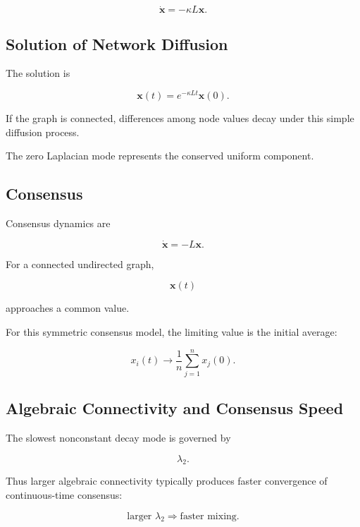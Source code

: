 \[
\boxed{
\dot{\mathbf{x}}
=
-\kappa L\mathbf{x}.
}
\]

\subsection{Solution of Network Diffusion}
\label{subsec:network-diffusion-solution}

The solution is

\[
\boxed{
\mathbf{x}(t)
=
e^{-\kappa Lt}
\mathbf{x}(0).
}
\]

If the graph is connected, differences among node values decay under this
simple diffusion process.

The zero Laplacian mode represents the conserved uniform component.

\subsection{Consensus}
\label{subsec:network-consensus}

Consensus dynamics are

\[
\boxed{
\dot{\mathbf{x}}
=
-L\mathbf{x}.
}
\]

For a connected undirected graph,

\[
\mathbf{x}(t)
\]

approaches a common value.

For this symmetric consensus model, the limiting value is the initial
average:

\[
\boxed{
x_i(t)
\to
\frac1n
\sum_{j=1}^{n}x_j(0).
}
\]

\subsection{Algebraic Connectivity and Consensus Speed}
\label{subsec:algebraic-connectivity-consensus}

The slowest nonconstant decay mode is governed by

\[
\lambda_2.
\]

Thus larger algebraic connectivity typically produces faster convergence of
continuous-time consensus:

\[
\boxed{
\text{larger }\lambda_2
\Rightarrow
\text{faster mixing}.
}
\]

